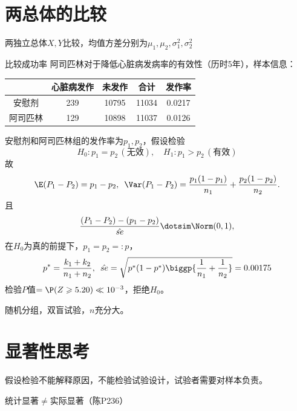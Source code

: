 \section{两总体的比较}
两独立总体$X,Y$比较，均值方差分别为$\mu_1,\mu_2,\sigma_1^2,\sigma_2^2$

\begin{example}{比较成功率}{}
	阿司匹林对于降低心脏病发病率的有效性（历时5年），样本信息：
	\begin{center}
		\begin{tabular}{c|cccc}
			\toprule
			&心脏病发作&未发作&合计&发作率\\
			\midrule
			安慰剂&239&10795&11034&0.0217\\
			阿司匹林&129&10898&11037&0.0126\\
			\bottomrule
		\end{tabular}
	\end{center}
	安慰剂和阿司匹林组的发作率为$p_1,p_2$，假设检验 
	\[
		H_0:p_1=p_2\,(\text{无效}),\quad H_1:p_1>p_2\,(\text{有效})
	\]
	故
	\[
		\E(P_1-P_2)=p_1-p_2,\enspace\Var(P_1-P_2)=\frac{p_1(1-p_1)}{n_1}+\frac{p_2(1-p_2)}{n_2}.
	\]
	且
	\[
		\frac{(P_1-P_2)-(p_1-p_2)}{\hat{se}}\dotsim\Norm(0,1),
	\]
	在$H_0$为真的前提下，$p_1=p_2=:p$，
	\[
		p^\ast=\frac{k_1+k_2}{n_1+n_2},\enspace\hat{se}=\sqrt{p^\ast(1-p^\ast)\biggp{\frac1{n_1}+\frac1{n_2}}}=0.00175
	\]
	检验$P$值$=\P(Z\geqslant 5.20)\ll 10^{-3}$，拒绝$H_0$。
\end{example}
\begin{remark}
	随机分组，双盲试验，$n$充分大。
\end{remark}

\section{显著性思考}
假设检验不能解释原因，不能检验试验设计，试验者需要对样本负责。

统计显著$\neq$实际显著（陈P236）